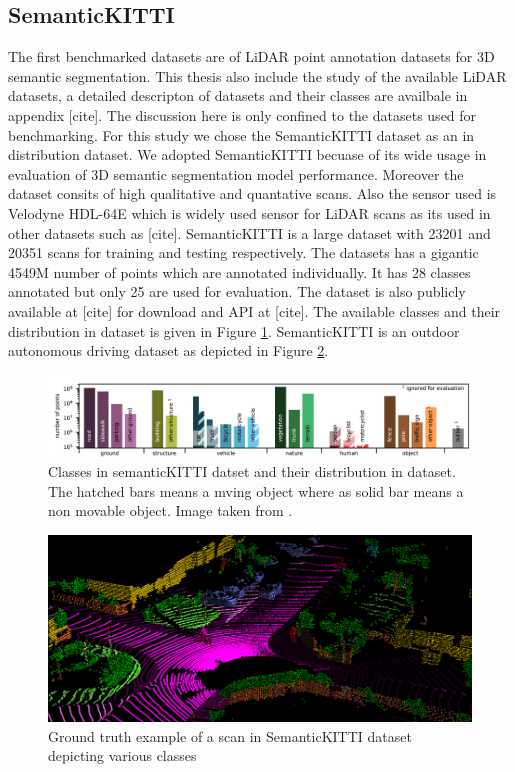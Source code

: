 \subsection{SemanticKITTI}
The first benchmarked datasets are of LiDAR point annotation datasets for 3D semantic segmentation.
This thesis also include the study of the available LiDAR datasets, a detailed descripton of datasets and their classes are availbale in appendix [cite]. 
The discussion here is only confined to the datasets used for benchmarking. 
For this study we chose the SemanticKITTI dataset \cite{Behley_2019_SemanticKITTI} as an in distribution dataset.
We adopted SemanticKITTI becuase of its wide usage in evaluation of 3D semantic segmentation model performance. 
Moreover the dataset consits of high qualitative and quantative scans. 
Also the sensor used is Velodyne HDL-64E which is widely used sensor for LiDAR scans as its used in other datasets such as [cite].
SemanticKITTI \cite{Behley_2019_SemanticKITTI} is a large dataset with 23201 and 20351 scans for training and testing respectively. 
The datasets has a gigantic 4549M number of points which are annotated individually.
It has 28 classes annotated but only 25 are used for evaluation. 
The dataset is also publicly available at [cite] for download and API at [cite].
The available classes and their distribution in dataset is given in Figure \ref{fig:semantic_label_distribution}.
SemanticKITTI is an outdoor autonomous driving dataset as depicted in Figure \ref{fig:semantic_ground_truth_1}.
\begin{figure}[t]
    \centering
    \includegraphics[scale=0.41]{images/semantic_label_distribution.png}
    \caption{Classes in semanticKITTI datset and their distribution in dataset. The hatched bars means a mving object where as solid bar means a non movable object. Image taken from \cite{Behley_2019_SemanticKITTI}.}
    \label{fig:semantic_label_distribution}
\end{figure}
\begin{figure}[t]
    \centering
    \includegraphics[scale=0.45]{images/semantic_true_label_1.png}
    \caption{Ground truth example of a scan in SemanticKITTI dataset depicting various classes}
    \label{fig:semantic_ground_truth_1}
\end{figure}

